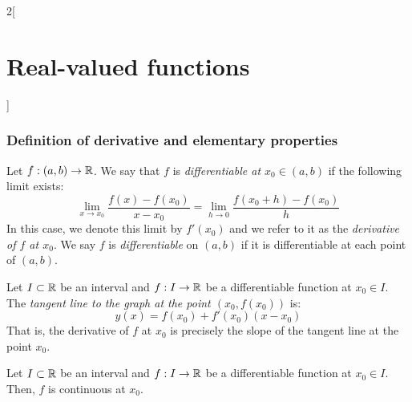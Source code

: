 \documentclass[../../../main.tex]{subfiles}
\begin{document}
\begin{multicols}{2}[\section{Real-valued functions}]
  \subsubsection{Definition of derivative and elementary properties}
  \begin{definition}
    Let $f:(a,b)\rightarrow\mathbb{R}$. We say that $f$ is \emph{differentiable at $x_0\in(a,b)$} if the following limit exists: $$\lim_{x\to x_0}\frac{f(x)-f(x_0)}{x-x_0}=\lim_{h\to 0}\frac{f(x_0+h)-f(x_0)}{h}$$
    In this case, we denote this limit by $f'(x_0)$ and we refer to it as the \emph{derivative of $f$ at $x_0$}. We say $f$ is \emph{differentiable} on $(a,b)$ if it is differentiable at each point of $(a,b)$.
  \end{definition}
  \begin{proposition}
    Let $I\subset\mathbb{R}$ be an interval and $f:I\rightarrow\mathbb{R}$ be a differentiable function at $x_0\in I$. The \emph{tangent line to the graph at the point $(x_0,f(x_0))$} is: $$y(x)=f(x_0)+f'(x_0)(x-x_0)$$ That is, the derivative of $f$ at $x_0$ is precisely the slope of the tangent line at the point $x_0$.
  \end{proposition}
  \begin{lemma}
    Let $I\subset\mathbb{R}$ be an interval and $f:I\rightarrow\mathbb{R}$ be a differentiable function at $x_0\in I$. Then, $f$ is continuous at $x_0$.
  \end{lemma}

\end{multicols}
\end{document}
